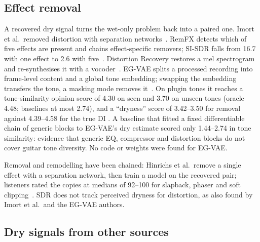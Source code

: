 \subsection{Effect removal}

A recovered dry signal turns the wet-only problem back into a paired one. Imort
et al.\ removed distortion with separation networks~\cite{imort2022distortion}.
RemFX detects which of five effects are present and chains effect-specific
removers; SI-SDR falls from 16.7\dB{} with one effect to 2.6\dB{} with
five~\cite{rice2023general}. Distortion Recovery restores a mel spectrogram and
re-synthesises it with a vocoder~\cite{lee2024distortion}. EG-VAE splits a
processed recording into frame-level content and a global tone embedding;
swapping the embedding transfers the tone, a masking mode removes
it~\cite{yeh2026egvae}. On plugin tones it reaches a tone-similarity opinion
score of 4.30 on seen and 3.70 on unseen tones (oracle 4.48; baselines at most
2.74), and a ``dryness'' score of 3.42--3.50 for removal against 4.39--4.58 for
the true DI \reported. A baseline that fitted a fixed differentiable chain of
generic blocks to EG-VAE's dry estimate scored only 1.44--2.74 in tone
similarity: evidence that generic EQ, compressor and distortion blocks do not
cover guitar tone diversity. No code or weights were found for EG-VAE.

Removal and remodelling have been chained: Hinrichs et al.\ remove a single
effect with a separation network, then train a model on the recovered pair;
listeners rated the copies at medians of 92--100 for slapback, phaser and soft
clipping~\cite{hinrichs2024blind}. SDR does not track perceived dryness for
distortion, as also found by Imort et al.\ and the EG-VAE authors.

\subsection{Dry signals from other sources}

